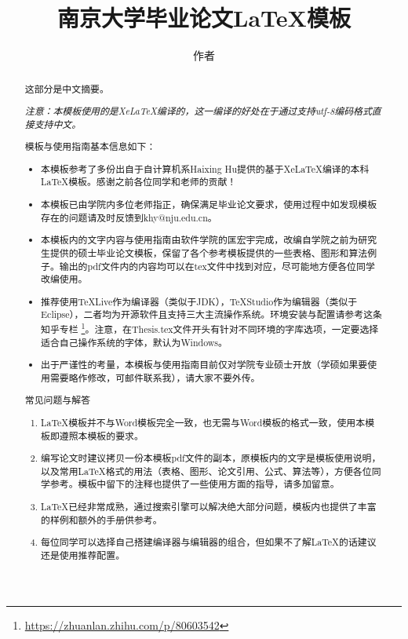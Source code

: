 \documentclass[winfonts,master,twoside,AutoFakeBold= {2}]{njuthesis}
\title{南京大学毕业论文\LaTeX 模板}
\author{作者}
\institute{南京大学}
\begin{document}

\maketitle
\makeenglishtitle


\frontmatter

\begin{abstract}
	这部分是中文摘要。
	
	\textit{注意：本模板使用的是XeLaTeX编译的，这一编译的好处在于通过支持utf-8编码格式直接支持中文。}
	
	模板与使用指南基本信息如下：
	\begin{itemize}
		\item 本模板参考了多份出自于自计算机系Haixing Hu提供的基于XeLaTeX编译的本科LaTeX模板。感谢之前各位同学和老师的贡献！
		\item 本模板已由学院内多位老师指正，确保满足毕业论文要求，使用过程中如发现模板存在的问题请及时反馈到khy@nju.edu.cn。
		\item 本模板内的文字内容与使用指南由软件学院的匡宏宇完成，改编自学院之前为研究生提供的硕士毕业论文模板，保留了各个参考模板提供的一些表格、图形和算法例子。输出的pdf文件内的内容均可以在tex文件中找到对应，尽可能地方便各位同学改编使用。
		\item 推荐使用TeXLive作为编译器（类似于JDK），TeXStudio作为编辑器（类似于Eclipse），二者均为开源软件且支持三大主流操作系统。环境安装与配置请参考这条知乎专栏 \footnote{\url{https://zhuanlan.zhihu.com/p/80603542}}。注意，在Thesis.tex文件开头有针对不同环境的字库选项，一定要选择适合自己操作系统的字体，默认为Windows。
		\item  出于严谨性的考量，本模板与使用指南目前仅对学院专业硕士开放（学硕如果要使用需要略作修改，可邮件联系我），请大家不要外传。
	\end{itemize}
	
	常见问题与解答
	\begin{enumerate}
		\item LaTeX模板并不与Word模板完全一致，也无需与Word模板的格式一致，使用本模板即遵照本模板的要求。
		\item 编写论文时建议拷贝一份本模板pdf文件的副本，原模板内的文字是模板使用说明，以及常用LaTeX格式的用法（表格、图形、论文引用、公式、算法等），方便各位同学参考。模板中留下的注释也提供了一些使用方面的指导，请多加留意。
		\item LaTeX已经非常成熟，通过搜索引擎可以解决绝大部分问题，模板内也提供了丰富的样例和额外的手册供参考。
		\item 每位同学可以选择自己搭建编译器与编辑器的组合，但如果不了解LaTeX的话建议还是使用推荐配置。
	\end{enumerate}
\end{abstract}
\end{document}
